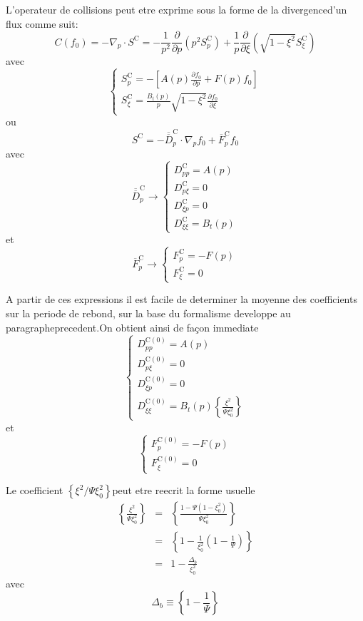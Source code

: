 L'operateur de collisions peut etre exprime sous la forme de la divergenced'un
flux comme suit: \[
C(f_{0})=-\nabla_{p}\cdot S^{\text{C}}=-\frac{1}{p^{2}}\frac{\partial}{\partial p}\left(p^{2}S_{p}^{\text{C}}\right)+\frac{1}{p}\frac{\partial}{\partial\xi}\left(\sqrt{1-\xi^{2}}S_{\xi}^{\text{C}}\right)\]
avec \[
\left\{ \begin{array}{l}
S_{p}^{\text{C}}=-\left[A(p)\frac{\partial f_{0}}{\partial p}+F(p)f_{0}\right]\\
S_{\xi}^{\text{C}}=\frac{B_{t}(p)}{p}\sqrt{1-\xi^{2}}\frac{\partial f_{0}}{\partial\xi}\end{array}\right.\]
ou \[
S^{\text{C}}=-\overline{\overline{D}}_{p}^{\text{C}}\cdot\nabla_{p}f_{0}+\overline{F}_{p}^{\text{C}}f_{0}\]
avec \[
\overline{\overline{D}}_{p}^{\text{C}}\rightarrow\left\{ \begin{array}{l}
D_{pp}^{\text{C}}=A(p)\\
D_{p\xi}^{\text{C}}=0\\
D_{\xi p}^{\text{C}}=0\\
D_{\xi\xi}^{\text{C}}=B_{t}(p)\end{array}\right.\]
et \[
\overline{F}_{p}^{\text{C}}\rightarrow\left\{ \begin{array}{l}
F_{p}^{\text{C}}=-F(p)\\
F_{\xi}^{\text{C}}=0\end{array}\right.\]


A partir de ces expressions il est facile de determiner la moyenne
des coefficients sur la periode de rebond, sur la base du formalisme
developpe au paragrapheprecedent.On obtient ainsi de fa\c{c}on immediate
\[
\left\{ \begin{array}{l}
D_{pp}^{\text{C}(0)}=A(p)\\
D_{p\xi}^{\text{C}(0)}=0\\
D_{\xi p}^{\text{C}(0)}=0\\
D_{\xi\xi}^{\text{C}(0)}=B_{t}(p)\left\{ \frac{\xi^{2}}{\Psi\xi_{0}^{2}}\right\} \end{array}\right.\]
et \[
\left\{ \begin{array}{l}
F_{p}^{\text{C}(0)}=-F(p)\\
F_{\xi}^{\text{C}(0)}=0\end{array}\right.\]


Le coefficient $\left\{ \xi^{2}/\Psi\xi_{0}^{2}\right\} $peut etre
reecrit la forme usuelle \begin{eqnarray*}
\left\{ \frac{\xi^{2}}{\Psi\xi_{0}^{2}}\right\}  & = & \left\{ \frac{1-\Psi\left(1-\xi_{0}^{2}\right)}{\Psi\xi_{0}^{2}}\right\} \\
 & = & \left\{ 1-\frac{1}{\xi_{0}^{2}}\left(1-\frac{1}{\Psi}\right)\right\} \\
 & = & 1-\frac{\Delta_{b}}{\xi_{0}^{2}}\end{eqnarray*}
avec \[
\Delta_{b}\equiv\left\{ 1-\frac{1}{\Psi}\right\} \]


